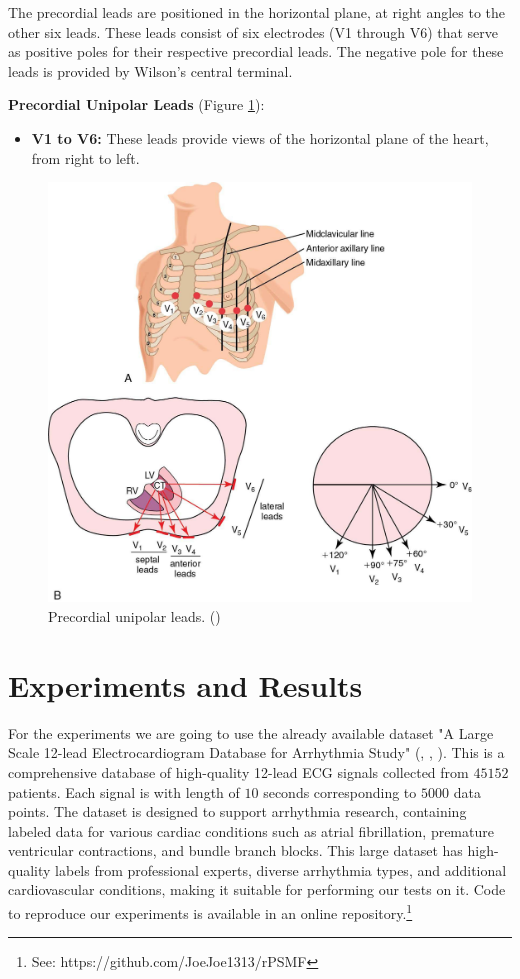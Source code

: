 \documentclass{mldsmsc}
\begin{document}
\noindent The precordial leads are positioned in the horizontal plane, at right angles to the other six leads. These leads consist of six electrodes (V1 through V6) that serve as positive poles for their respective precordial leads. The negative pole for these leads is provided by Wilson's central terminal. \newline

\noindent \textbf{Precordial Unipolar Leads} (Figure \ref{fig:vs}):
\begin{itemize}
    \item \textbf{V1 to V6:} These leads provide views of the horizontal plane of the heart, from right to left.
\end{itemize}

\begin{figure}[h]
\centering
\includegraphics[width=0.3\linewidth]{images/vs.jpg}
\caption{Precordial unipolar leads. (\cite{huszar})}
\label{fig:vs}
\end{figure}

\clearpage

\chapter{Experiments and Results} \label{ch:3}

For the experiments we are going to use the already available dataset "A Large Scale 12-lead Electrocardiogram Database for Arrhythmia Study" (\cite{cite1}, \cite{cite2}, \cite{cite3}). This is a comprehensive database of high-quality 12-lead ECG signals collected from $45 152$ patients. Each signal is with length of $10$ seconds corresponding to $5 000$ data points. The dataset is designed to support arrhythmia research, containing labeled data for various cardiac conditions such as atrial fibrillation, premature ventricular contractions, and bundle branch blocks. This large dataset has high-quality labels from professional experts, diverse arrhythmia types, and additional cardiovascular conditions, making it suitable for performing our tests on it. Code to reproduce our experiments is available in an online repository.\footnote{See: https://github.com/JoeJoe1313/rPSMF} \newline
\end{document}
